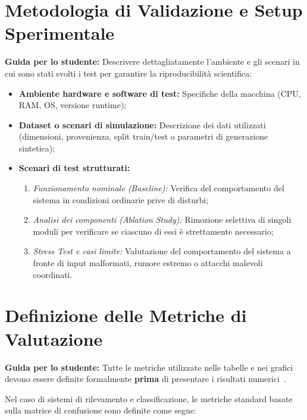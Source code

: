 \section{Metodologia di Validazione e Setup Sperimentale}
\label{sec:metodologia-validazione}

\textbf{Guida per lo studente:} Descrivere dettagliatamente l'ambiente e gli scenari in cui sono stati svolti i test per garantire la riproducibilità scientifica:
\begin{itemize}
    \item \textbf{Ambiente hardware e software di test:} Specifiche della macchina (CPU, RAM, OS, versione runtime);
    \item \textbf{Dataset o scenari di simulazione:} Descrizione dei dati utilizzati (dimensioni, provenienza, split train/test o parametri di generazione sintetica);
    \item \textbf{Scenari di test strutturati:}
    \begin{enumerate}
        \item \emph{Funzionamento nominale (Baseline):} Verifica del comportamento del sistema in condizioni ordinarie prive di disturbi;
        \item \emph{Analisi dei componenti (Ablation Study):} Rimozione selettiva di singoli moduli per verificare se ciascuno di essi è strettamente necessario;
        \item \emph{Stress Test e casi limite:} Valutazione del comportamento del sistema a fronte di input malformati, rumore estremo o attacchi malevoli coordinati.
    \end{enumerate}
\end{itemize}


\section{Definizione delle Metriche di Valutazione}
\label{sec:metriche-valutazione}

\textbf{Guida per lo studente:} Tutte le metriche utilizzate nelle tabelle e nei grafici devono essere definite formalmente \textbf{prima} di presentare i risultati numerici~\cite{powers2020evaluation}.

Nel caso di sistemi di rilevamento e classificazione, le metriche standard basate sulla matrice di confusione sono definite come segue:

